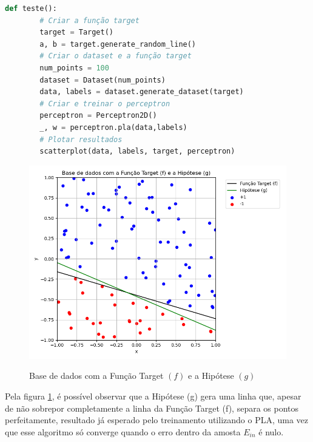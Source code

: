\begin{lstlisting}[language=Python, caption=Teste das classes, label=cod:perceptron_test]
    def teste():
        # Criar a função target
        target = Target()
        a, b = target.generate_random_line()
        # Criar o dataset e a função target
        num_points = 100
        dataset = Dataset(num_points)
        data, labels = dataset.generate_dataset(target)
        # Criar e treinar o perceptron
        perceptron = Perceptron2D()
        _, w = perceptron.pla(data,labels)
        # Plotar resultados
        scatterplot(data, labels, target, perceptron)
\end{lstlisting}

\begin{figure}[H]
    \caption{Base de dados com a Função Target $(f)$ e a Hipótese $(g)$}
       \centering
       \includegraphics[width=\textwidth]{perceptron_plot.png}
    \label{fig:perceptron_plot}
\end{figure}

Pela figura \ref{fig:perceptron_plot}, é possível observar que a Hipótese (g) gera uma linha que, apesar de não sobrepor completamente a linha da Função Target (f), separa os pontos perfeitamente, resultado já esperado pelo treinamento utilizando o PLA, uma vez que esse algoritmo só converge quando o erro dentro da amosta $E_{in}$ é nulo.  

